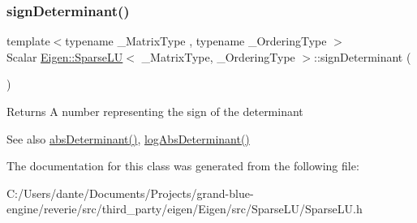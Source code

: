 \subsubsection{\texorpdfstring{signDeterminant()}{signDeterminant()}}
{\footnotesize\ttfamily template$<$typename \+\_\+\+Matrix\+Type , typename \+\_\+\+Ordering\+Type $>$ \\
Scalar \mbox{\hyperlink{class_eigen_1_1_sparse_l_u}{Eigen\+::\+Sparse\+LU}}$<$ \+\_\+\+Matrix\+Type, \+\_\+\+Ordering\+Type $>$\+::sign\+Determinant (\begin{DoxyParamCaption}{ }\end{DoxyParamCaption})\hspace{0.3cm}{\ttfamily [inline]}}

\begin{DoxyReturn}{Returns}
A number representing the sign of the determinant
\end{DoxyReturn}
\begin{DoxySeeAlso}{See also}
\mbox{\hyperlink{class_eigen_1_1_sparse_l_u_a06fa89424239fb169d408f08252426d0}{abs\+Determinant()}}, \mbox{\hyperlink{class_eigen_1_1_sparse_l_u_a89e30a7df205596784a5a73f4768eaec}{log\+Abs\+Determinant()}} 
\end{DoxySeeAlso}


The documentation for this class was generated from the following file\+:\begin{DoxyCompactItemize}
\item 
C\+:/\+Users/dante/\+Documents/\+Projects/grand-\/blue-\/engine/reverie/src/third\+\_\+party/eigen/\+Eigen/src/\+Sparse\+L\+U/Sparse\+L\+U.\+h\end{DoxyCompactItemize}
